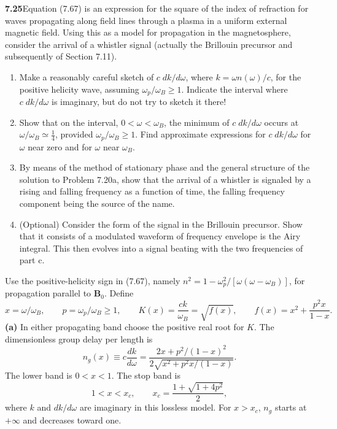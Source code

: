 \par\bigskip
\noindent\textbf{7.25}\quad Equation (7.67) is an expression for the square of the index of refraction for waves propagating along field lines through a plasma in a uniform external magnetic field. Using this as a model for propagation in the magnetosphere, consider the arrival of a whistler signal (actually the Brillouin precursor and subsequently of Section 7.11).
\begin{enumerate}
\item[(a)] Make a reasonably careful sketch of $c\;dk/d\omega$, where $k=\omega n(\omega)/c$, for the positive helicity wave, assuming $\omega_{p}/\omega_{B}\geq1$. Indicate the interval where $c\;dk/d\omega$ is imaginary, but do not try to sketch it there!
\item[(b)] Show that on the interval, $0<\omega<\omega_{B}$, the minimum of $c\;dk/d\omega$ occurs at $\omega/\omega_{B}\simeq\frac{1}{4}$, provided $\omega_{p}/\omega_{B}\geq1$. Find approximate expressions for $c\;dk/d\omega$ for $\omega$ near zero and for $\omega$ near $\omega_{B}$.
\item[(c)] By means of the method of stationary phase and the general structure of the solution to Problem 7.20a, show that the arrival of a whistler is signaled by a rising and falling frequency as a function of time, the falling frequency component being the source of the name.
\item[(d)] (Optional) Consider the form of the signal in the Brillouin precursor. Show that it consists of a modulated waveform of frequency  envelope is the Airy integral. This then evolves into a signal beating with the two frequencies of part c.
\end{enumerate}
\solution
Use the positive-helicity sign in (7.67), namely
$n^2=1-\omega_p^2/[\omega(\omega-\omega_B)]$, for propagation
parallel to $\mathbf B_0$. Define
\[
x=\omega/\omega_B,\qquad p=\omega_p/\omega_B\geq1,
\qquad K(x)=\frac{ck}{\omega_B}=\sqrt{f(x)},\qquad
f(x)=x^2+\frac{p^2x}{1-x}.
\]
\textbf{(a)} In either propagating band choose the positive real
root for $K$. The dimensionless group delay per length is
\[
\boxed{n_g(x)\equiv c\frac{dk}{d\omega}
=\frac{2x+p^2/(1-x)^2}{2\sqrt{x^2+p^2x/(1-x)}}.}
\]
The lower band is $0<x<1$. The stop band is
\[
1<x<x_c,\qquad x_c=\frac{1+\sqrt{1+4p^2}}2,
\]
where $k$ and $dk/d\omega$ are imaginary in this lossless model.
For $x>x_c$, $n_g$ starts at $+\infty$ and decreases toward one.
